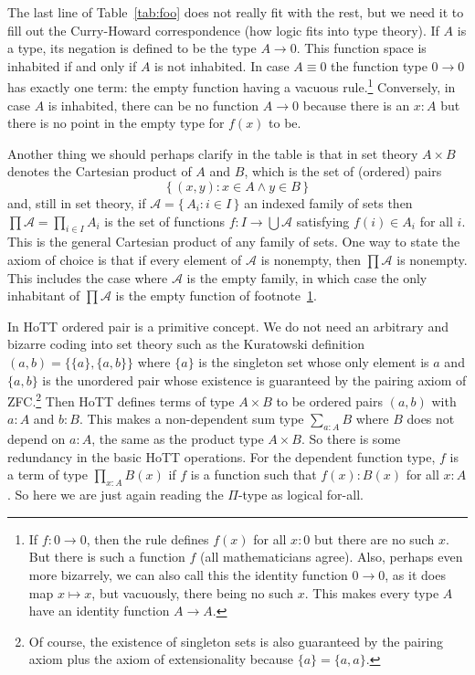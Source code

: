 \documentclass[11pt]{article}
\newcommand{\set}[1]{\{\,#1\,\}}
\begin{document}
The last line of Table~\ref{tab:foo} does not really fit with the rest,
but we need it to fill out the Curry-Howard correspondence (how logic fits
into type theory).  If $A$ is a type, its negation
is defined to be the type $A \to 0$.   This function space is inhabited
if and only if $A$ is not inhabited.  In case $A \equiv 0$ the function
type $0 \to 0$ has exactly one term: the empty function having a vacuous
rule.\footnote{If $f : 0 \to 0$, then the rule
defines $f(x)$ for all $x : 0$ but there are no such $x$.
But there is such a function $f$
(all mathematicians agree).\label{foot:emptyfun}
Also, perhaps even more bizarrely, we can also call this the identity
function $0 \to 0$, as it does map $x \mapsto x$, but vacuously, there
being no such $x$.  This makes every type $A$ have an identity function
$A \to A$.}
Conversely, in case $A$ is inhabited, there can be no function $A \to 0$
because there is an $x : A$ but there is no point in the empty type for $f(x)$
to be.

Another thing we should perhaps clarify in the table is that in set theory
$A \times B$ denotes the Cartesian product of $A$ and $B$, which is the
set of (ordered) pairs
$$
   \set{ (x, y) : x \in A \wedge y \in B }
$$
and, still in set theory, if $\mathcal{A} = \set{ A_i : i \in I }$ an
indexed family of sets then $\prod \mathcal{A} = \prod_{i \in I} A_i$
is the set of functions $f : I \to \bigcup \mathcal{A}$
satisfying $f(i) \in A_i$ for all $i$.  This is the general Cartesian
product of any family of sets.  One way to state the axiom of choice is
that if every element of $\mathcal{A}$ is nonempty, then $\prod \mathcal{A}$
is nonempty.  This includes the case where $\mathcal{A}$ is the empty family,
in which case the only inhabitant of $\prod \mathcal{A}$ is 
the empty function of footnote~\ref{foot:emptyfun}.

In HoTT ordered pair is a primitive concept.  We do not need an arbitrary
and bizarre coding into set theory such as the Kuratowski definition
$(a, b) = \{\{a\}, \{a, b\}\}$ where $\{a\}$ is the singleton set whose
only element is $a$ and $\{a, b\}$ is the unordered pair whose existence
is guaranteed by the pairing axiom of ZFC.\footnote{Of course, the existence
of singleton sets is also guaranteed by the pairing axiom plus the axiom of
extensionality because $\{a\} = \{a, a\}$.}  Then HoTT defines terms of
type $A \times B$ to be ordered pairs $(a, b)$ with $a : A$ and $b : B$.
This makes a non-dependent sum type $\sum_{a : A} B$ where $B$ does not
depend on $a : A$, the same as the product type $A \times B$.  So there is
some redundancy in the basic HoTT operations.
For the dependent function type, $f$ is a term of type $\prod_{x : A} B(x)$
if $f$ is a function such that $f(x) : B(x)$ for all $x : A$.  So here we
are just again reading the $\Pi$-type as logical for-all.
\end{document}

